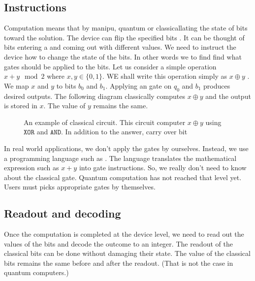 \documentclass[letterpaper,10pt,english]{jupyterBook}
\let\sphinxpxdimen\pdfpxdimen\else\newdimen\sphinxpxdimen
\begin{document}
\subsection{Instructions}
\label{\detokenize{computation/ccomp:instructions}}
\sphinxAtStartPar
Computation means that by manipu, quantum or classicallating the state of bits toward the solution.  The device can flip the specified bits .  It can be thought of bits entering a  and coming out with different values.  We need to instruct the device how to change the state of the bits.  In other words we to find find what gates should be applied to the bits. Let us consider a simple operation \(x+y \mod 2\) where \(x, y \in \{0, 1\}\).  WE shall write this operation simply as \(x \oplus y\) . We map \(x\) and \(y\) to bits \(b_0\) and \(b_1\). Applying an  gate on \(q_0\) and \(b_1\) produces desired outputs.   The following diagram classically computes \(x \oplus y\) and the output is stored in \(x\). The value of \(y\) remains the same.

\begin{figure}[htbp]
\centering
\capstart

\noindent\sphinxincludegraphics[width=400\sphinxpxdimen]{{classical-half-adder}.png}
\caption{An example of classical circuit.  This circuit computer \(x \oplus y\) using \(\texttt{XOR}\) and \(\texttt{AND}\).  In addition to the answer, carry over bit}\label{\detokenize{computation/ccomp:classical-half-adder}}\end{figure}

\sphinxAtStartPar
In real world applications, we don’t apply the gates by ourselves.  Instead, we use a programming language such as . The language translates the mathematical  expression such as \(x + y\) into gate instructions. So, we really don’t need to know about the classical gate.  Quantum computation has not reached that level yet. Users must picks appropriate gates by themselves.


\subsection{Readout and decoding}
\label{\detokenize{computation/ccomp:readout-and-decoding}}
\sphinxAtStartPar
Once the computation is completed at the device level, we need to read out the values of the bits and decode the outcome to an integer.  The readout of the classical bits can be done without damaging their state.  The value of the classical bits remains the same before and after the readout.  (That is not the case in quantum computers.)
\end{document}
